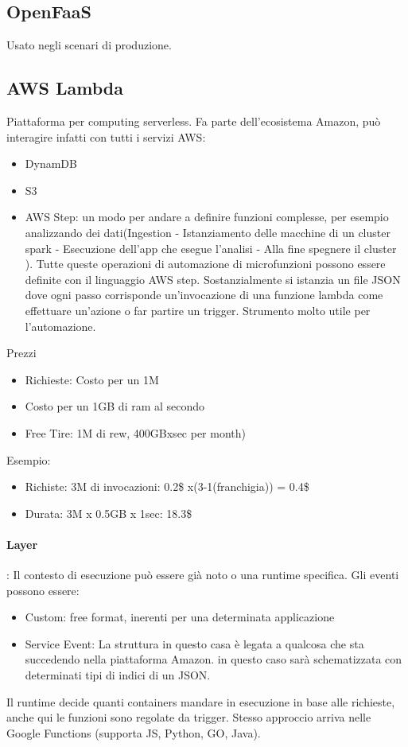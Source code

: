 \documentclass{article}
\begin{document}
		\subsection{OpenFaaS}
		Usato negli scenari di produzione.
		
		\subsection{AWS Lambda}
		Piattaforma per computing serverless. Fa parte dell'ecosistema Amazon, può interagire infatti con tutti i servizi AWS:
		\begin{itemize}
		    \item DynamDB
		    \item S3
		    \item AWS Step: un modo per andare a definire funzioni complesse, per esempio analizzando dei dati(Ingestion - Istanziamento delle macchine di un cluster spark - Esecuzione dell'app che esegue l'analisi - Alla fine spegnere il cluster ). Tutte queste operazioni di automazione di microfunzioni possono essere definite con il linguaggio AWS step. Sostanzialmente si istanzia un file JSON dove ogni passo corrisponde un'invocazione di una funzione lambda come effettuare un'azione o far partire un trigger. Strumento molto utile per l'automazione.
		\end{itemize}
		Prezzi
		\begin{itemize}
		    \item Richieste: Costo per un 1M
		    \item Costo per un 1GB di ram al secondo
		    \item Free Tire: 1M di rew, 400GBxsec per month)
		\end{itemize}
		Esempio:
		\begin{itemize}
		    \item Richiste: 3M di invocazioni: 0.2\$ x(3-1(franchigia)) = 0.4\$
		    \item Durata: 3M x 0.5GB x 1sec: 18.3\$
		\end{itemize}
		\paragraph{Layer}:
		Il contesto di esecuzione può essere già noto o una runtime specifica.
		Gli eventi possono essere:
		\begin{itemize}
		    \item Custom: free format, inerenti per una determinata applicazione
		    \item Service Event: La struttura in questo casa è legata a qualcosa che sta succedendo nella piattaforma Amazon. in questo caso sarà schematizzata con determinati tipi di indici di un JSON.
		\end{itemize}
		Il runtime decide quanti containers mandare in esecuzione in base alle richieste, anche qui le funzioni sono regolate da trigger. Stesso approccio arriva nelle Google Functions (supporta JS, Python, GO, Java).
		
\end{document}
